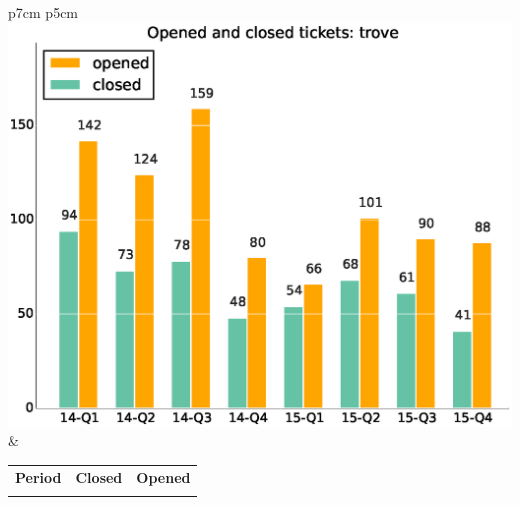\documentclass[a4wide,11pt]{article}
\begin{document}
\begin{tabular}{p{7cm} p{5cm}}
    \vspace{0pt} 
    \includegraphics[scale=.35]{figs/closedtrove.eps}
    & 
    \vspace{0pt}
    \begin{tabular}{l|r|r|}%
\bfseries Period & \bfseries Closed & \bfseries Opened
    \csvreader[head to column names]{data/closedtrove.csv}{}%
    {\\ & \closed & \opened}
    \end{tabular}
\end{tabular}
\end{document}
